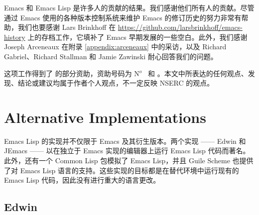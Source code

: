 \documentclass[format=acmsmall,screen]{acmart}
\newcommand \Elisp {Emacs Lisp}
\begin{document}


\begin{acks}
Emacs 和 Emacs Lisp 是许多人的贡献的结果。我们感谢他们所有人的贡献。尽管通过 Emacs 使用的各种版本控制系统来维护 Emacs 的修订历史的努力非常有帮助，我们也要感谢 Lars Brinkhoff 在 \url{https://github.com/larsbrinkhoff/emacs-history} 上的存档工作，它填补了 Emacs 早期发展的一些空白。此外，我们感谢 Joseph Arceneaux 在附录 \ref{appendix:arceneaux} 中的采访，以及 Richard Gabriel、Richard Stallman 和 Jamie Zawinski 耐心回答我们的问题。

这项工作得到了  的部分资助，资助号码为 N$^o$~ 和 。本文中所表达的任何观点、发现、结论或建议均属于作者个人观点，不一定反映 NSERC 的观点。
\end{acks}

\appendix

\section{Alternative Implementations}
\label{sec:alternative-implementations}

Emacs Lisp 的实现并不仅限于 Emacs 及其衍生版本。两个实现 —— Edwin 和 JEmacs —— 以在独立于 Emacs 实现的编辑器上运行 Emacs Lisp 代码而著名。此外，还有一个 Common Lisp 包模拟了 Emacs Lisp，并且 Guile Scheme 也提供了对 Emacs Lisp 语言的支持。这些实现的目标都是在替代环境中运行现有的 Emacs Lisp 代码，因此没有进行重大的语言更改。

\subsection{Edwin}
\end{document}
